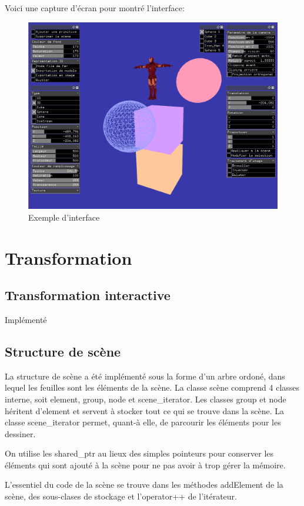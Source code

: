Voici une capture d'écran pour montré l'interface:
\begin{figure}[h]
	\centering
	\includegraphics[width=15cm]{fig/InterfaceComplet.png}
	\caption{Exemple d'interface}
	\label{fig:interface}
\end{figure}

\section{Transformation}
\subsection{Transformation interactive}
Implémenté

\subsection{Structure de scène}
La structure de scène a été implémenté sous la forme d'un arbre ordoné, dans lequel les feuilles sont les éléments de la scène. La classe scène comprend 4 classes interne, soit element, group, node et scene\_iterator. Les classes group et node héritent d'element et  servent à stocker tout ce qui se trouve dans la scène. La classe scene\_iterator permet, quant-à elle, de parcourir les éléments pour les dessiner. 

On utilise les shared\_ptr au lieux des simples pointeurs pour conserver les éléments qui sont ajouté à la scène pour ne pas avoir à trop gérer la mémoire.

L'essentiel du code de la scène se trouve dans les méthodes addElement de la scène, des sous-clases de stockage et l'operator++ de l'itérateur.

